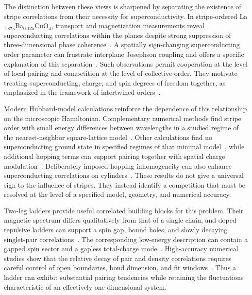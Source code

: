 \documentclass[11pt,letterpaper]{article}
\begin{document}
The distinction between these views is sharpened by separating the existence
of stripe correlations from their necessity for superconductivity. In
stripe-ordered La$_{1.875}$Ba$_{0.125}$CuO$_4$, transport and magnetization
measurements reveal superconducting correlations within the planes despite
strong suppression of three-dimensional phase
coherence~\citep{Li2007}. A spatially sign-changing superconducting order
parameter can frustrate interplane Josephson coupling and offers a specific
explanation of this separation~\citep{Berg2007}. Such observations permit
cooperation at the level of local pairing and competition at the level of
collective order. They motivate treating superconducting, charge, and spin
degrees of freedom together, as emphasized in the framework of intertwined
orders~\citep{Fradkin2015,Agterberg2020}.

Modern Hubbard-model calculations reinforce the dependence of this
relationship on the microscopic Hamiltonian. Complementary numerical methods
find stripe order with small energy differences between wavelengths in a
studied regime of the nearest-neighbor square-lattice
model~\citep{Zheng2017}. Other calculations find no superconducting ground state
in specified regimes of that minimal model~\citep{Qin2020}, while additional
hopping terms can support pairing together with spatial charge
modulation~\citep{JiangDevereaux2019,Xu2024}. Deliberately imposed hopping
inhomogeneity can also enhance superconducting correlations on
cylinders~\citep{JiangKivelson2022}. These results do not give a universal sign
to the influence of stripes. They instead identify a competition that must be
resolved at the level of a specified model, geometry, and numerical accuracy.

Two-leg ladders provide useful correlated building blocks for this problem.
Their magnetic spectrum differs qualitatively from that of a single chain,
and doped repulsive ladders can support a spin gap, bound holes, and slowly
decaying singlet-pair correlations~\citep{Dagotto1992,Noack1994,DagottoRice1996}.
The corresponding low-energy description can contain a gapped spin sector and
a gapless total-charge mode~\citep{LutherEmery1974,BalentsFisher1996}.
High-accuracy numerical studies show that the relative decay of pair and
density correlations requires careful control of open boundaries, bond
dimension, and fit windows~\citep{Dolfi2015,Shen2023}. Thus a ladder can exhibit
substantial pairing tendencies while retaining the fluctuations characteristic
of an effectively one-dimensional system.
\end{document}
